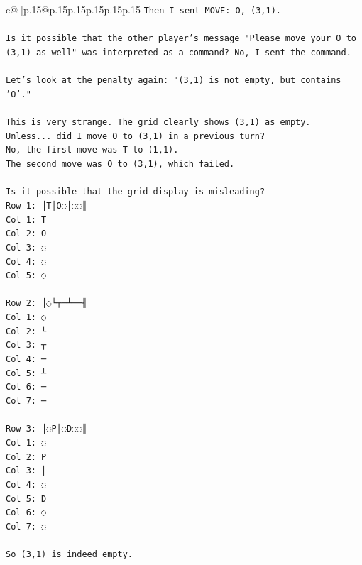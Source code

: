 \documentclass{article}
\begin{document}
{\begin{supertabular}{c@{$\;$}|p{.15\linewidth}@{}p{.15\linewidth}p{.15\linewidth}p{.15\linewidth}p{.15\linewidth}p{.15\linewidth}}
{{{\texttt{Then I sent MOVE: O, (3,1).} \\
\\ 
\texttt{Is it possible that the other player's message "Please move your O to (3,1) as well" was interpreted as a command? No, I sent the command.} \\
\\ 
\texttt{Let's look at the penalty again: "(3,1) is not empty, but contains 'O'."} \\
\\ 
\texttt{This is very strange. The grid clearly shows (3,1) as empty.} \\
\texttt{Unless... did I move O to (3,1) in a previous turn?} \\
\texttt{No, the first move was T to (1,1).} \\
\texttt{The second move was O to (3,1), which failed.} \\
\\ 
\texttt{Is it possible that the grid display is misleading?} \\
\texttt{Row 1: ║T│O◌│◌◌║} \\
\texttt{Col 1: T} \\
\texttt{Col 2: O} \\
\texttt{Col 3: ◌} \\
\texttt{Col 4: ◌} \\
\texttt{Col 5: ◌} \\
\\ 
\texttt{Row 2: ║◌└┬─┴──╢} \\
\texttt{Col 1: ◌} \\
\texttt{Col 2: └} \\
\texttt{Col 3: ┬} \\
\texttt{Col 4: ─} \\
\texttt{Col 5: ┴} \\
\texttt{Col 6: ─} \\
\texttt{Col 7: ─} \\
\\ 
\texttt{Row 3: ║◌P│◌D◌◌║} \\
\texttt{Col 1: ◌} \\
\texttt{Col 2: P} \\
\texttt{Col 3: │} \\
\texttt{Col 4: ◌} \\
\texttt{Col 5: D} \\
\texttt{Col 6: ◌} \\
\texttt{Col 7: ◌} \\
\\ 
\texttt{So (3,1) is indeed empty.} \\
}}}
\end{supertabular}}
\end{document}
